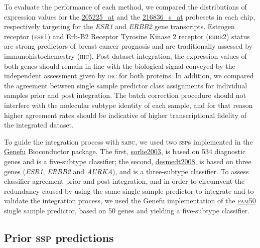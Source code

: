 \documentclass{article}\usepackage[]{graphicx}\usepackage[]{color}
\begin{document}
To evaluate the performance of each method, we compared the distributions of
expression values for the
\href{https://genecards.weizmann.ac.il/cgi-bin/geneannot/GA_search.pl?keyword_type=probe_set_id&array=HG-U133&target=genecards&keyword=205225_at}{205225\_at}
and the
\href{https://genecards.weizmann.ac.il/cgi-bin/geneannot/GA_search.pl?keyword_type=probe_set_id&array=HG-U133&target=genecards&keyword=216836_s_at}{216836\_s\_at}
probesets in each chip, respectively targeting for the \emph{ESR1} and
\emph{ERBB2} gene transcripts.  Estrogen receptor (\textsc{esr1}) and
Erb-B2 Receptor Tyrosine Kinase 2 receptor (\textsc{erbb2}) status are strong
predictors of breast cancer prognosis and are traditionally assessed by
immunohistochemestry (\textsc{ihc}).  Post dataset integration, the expression
values of both genes should remain in line with the biological signal conveyed
by the independent assessment given by \textsc{ihc} for both proteins.  In
addition, we compared the agreement between single sample predictor class
assignments for individual samples prior and post integration.  The batch
correction procedure should not interfere with the molecular subtype identity of
each sample, and for that reason higher agreement rates should be indicative of
higher transcriptional fidelity of the integrated dataset.

To guide the integration process with \textsc{sabc}, we used two \textsc{ssp}s
implemented in the
\href{https://bioconductor.org/packages/release/bioc/html/genefu.html}{\textsf{Genefu}}
Bioconductor package.  The first,
\href{http://www.pnas.org/content/100/14/8418}{\textsf{sorlie2003}}, is based on
534 diagnostic genes and is a five-subtype classifier; the second,
\href{http://clincancerres.aacrjournals.org/content/14/16/5158?ck=nck}{\textsf{desmedt2008}},
is based on three genes (\emph{ESR1}, \emph{ERBB2} and \emph{AURKA}), and is a
three-subtype classifier.  To assess classifier agreement prior and post
integration, and in order to circumvent the redundancy caused by using the same
single sample predictor to integrate and to validate the integration process, we
used the Genefu implementation of the
\href{http://ascopubs.org/doi/abs/10.1200/JCO.2008.18.1370}{\textsc{pam50}}
single sample predictor, based on 50 genes and yielding a five-subtype
classifier.

\subsection{Prior \textsc{ssp} predictions}
\label{sec:preds}
\end{document}
